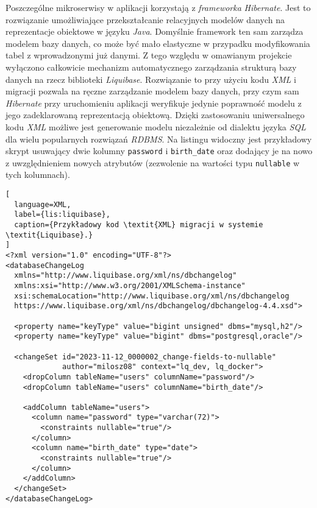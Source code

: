 Poszczególne mikroserwisy w aplikacji korzystają z \textit{frameworka} \textit{Hibernate}. Jest to rozwiązanie
umożliwiające przekształcanie relacyjnych modelów danych na reprezentacje obiektowe w języku \textit{Java}. Domyślnie
framework ten sam zarządza modelem bazy danych, co może być mało elastyczne w przypadku modyfikowania tabel z
wprowadzonymi już danymi. Z tego względu w omawianym projekcie wyłączono całkowicie mechanizm automatycznego zarządzania
strukturą bazy danych na rzecz biblioteki \textit{Liquibase}. Rozwiązanie to przy użyciu kodu \textit{XML} i migracji
pozwala na ręczne zarządzanie modelem bazy danych, przy czym sam \textit{Hibernate} przy uruchomieniu aplikacji
weryfikuje jedynie poprawność modelu z jego zadeklarowaną reprezentacją obiektową. Dzięki zastosowaniu uniwersalnego
kodu \textit{XML} możliwe jest generowanie modelu niezależnie od dialektu języka \textit{SQL} dla wielu popularnych
rozwiązań \textit{RDBMS}. Na listingu  widoczny jest przykładowy skrypt usuwający dwie kolumny
\verb|password| i \verb|birth_date| oraz dodający je na nowo z uwzględnieniem nowych atrybutów (zezwolenie na wartości
typu \verb|nullable| w tych kolumnach).
%
\begin{lstlisting}[
  language=XML,
  label={lis:liquibase},
  caption={Przykładowy kod \textit{XML} migracji w systemie \textit{Liquibase}.}
]
<?xml version="1.0" encoding="UTF-8"?>
<databaseChangeLog
  xmlns="http://www.liquibase.org/xml/ns/dbchangelog"
  xmlns:xsi="http://www.w3.org/2001/XMLSchema-instance"
  xsi:schemaLocation="http://www.liquibase.org/xml/ns/dbchangelog
  https://www.liquibase.org/xml/ns/dbchangelog/dbchangelog-4.4.xsd">

  <property name="keyType" value="bigint unsigned" dbms="mysql,h2"/>
  <property name="keyType" value="bigint" dbms="postgresql,oracle"/>

  <changeSet id="2023-11-12_0000002_change-fields-to-nullable"
             author="milosz08" context="lq_dev, lq_docker">
    <dropColumn tableName="users" columnName="password"/>
    <dropColumn tableName="users" columnName="birth_date"/>

    <addColumn tableName="users">
      <column name="password" type="varchar(72)">
        <constraints nullable="true"/>
      </column>
      <column name="birth_date" type="date">
        <constraints nullable="true"/>
      </column>
    </addColumn>
  </changeSet>
</databaseChangeLog>
\end{lstlisting}


